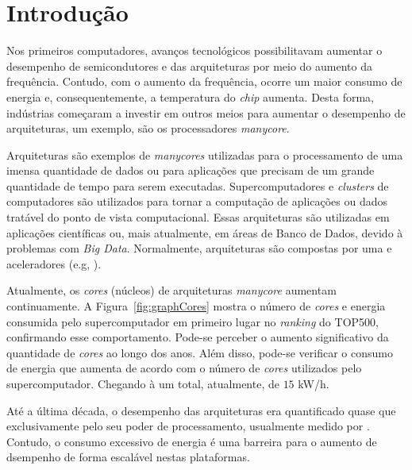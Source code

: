 \chapter{Introdução}


Nos primeiros computadores, avanços tecnológicos possibilitavam aumentar o
desempenho de semicondutores e das arquiteturas por meio do aumento da
frequência. Contudo, com o aumento da frequência, ocorre um maior consumo de
energia e, consequentemente, a temperatura do \textit{chip} aumenta. Desta
forma, indústrias começaram a investir em outros meios para aumentar o
desempenho de arquiteturas, um exemplo, são os processadores \textit{manycore}.

Arquiteturas \hpc são exemplos de \textit{manycores} utilizadas para o
processamento de uma imensa quantidade de dados ou para aplicações que precisam
de um grande quantidade de tempo para serem executadas. Supercomputadores e
\textit{clusters} de computadores são utilizados para tornar a computação de
aplicações ou dados tratável do ponto de vista computacional. Essas arquiteturas
são utilizadas em aplicações científicas ou, mais atualmente, em áreas de Banco
de Dados, devido à problemas com \textit{Big Data}. Normalmente, arquiteturas
\hpc são compostas por uma \cpu{} e aceleradores (e.g, \gpu).

Atualmente, os \textit{cores} (núcleos) de arquiteturas \textit{manycore}
aumentam continuamente. A Figura~\ref{fig:graphCores} mostra o número de
\textit{cores} e energia consumida pelo supercomputador em primeiro lugar no
\textit{ranking} do TOP500, confirmando esse comportamento. Pode-se perceber o
aumento significativo da quantidade de \textit{cores} ao longo dos anos.
Além disso, pode-se verificar o consumo de energia que aumenta de acordo com o
número de \textit{cores} utilizados pelo supercomputador. Chegando à um total,
atualmente, de $15$ kW/h.




Até a última década, o desempenho das arquiteturas \hpc era quantificado quase
que exclusivamente pelo seu poder de processamento, usualmente medido por
\flops. Contudo, o consumo excessivo de energia é uma barreira para o aumento de
dsempenho de forma escalável nestas plataformas.

